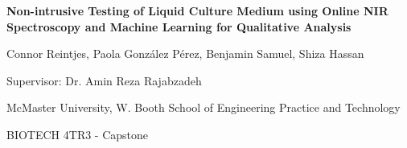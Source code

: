 \documentclass[12pt]{report}
\newcommand\titleofdoc{Non-intrusive Testing of Liquid Culture Medium using Online NIR Spectroscopy and Machine Learning for Qualitative Analysis} %
\begin{document}
\begin{titlepage}
   \begin{center}
        \vspace*{2.5cm} %

        \Large{\bfseries{\titleofdoc}} 

        \vspace{0.5cm}
            
        \vspace{3cm}
       
        \vspace{0.25cm}
        \large{Connor Reintjes, Paola Gonz\'alez P\'erez, Benjamin Samuel, Shiza Hassan}

        \vspace{0.25cm}
        \large{Supervisor: Dr. Amin Reza Rajabzadeh}
       
        \vspace{3 cm}
        \large{McMaster University, W. Booth School of Engineering Practice and Technology}
        
        \vspace{0.25 cm}
        \large{BIOTECH 4TR3 - Capstone}
       

       \vfill
    \end{center}
\end{titlepage}

\setcounter{page}{2}
\pagestyle{fancy}
\fancyhf{}
\rhead{\thepage}
\end{document}

